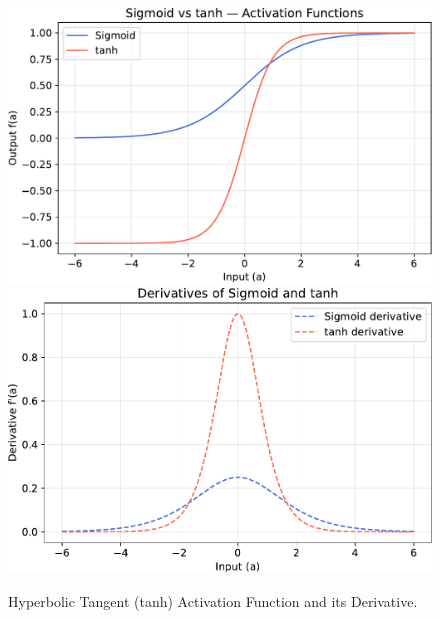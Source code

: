 \begin{figure}[!htp]
    \centering
    \includegraphics[width=\textwidth]{img/fnns/tanh-activation-functions.pdf}
    \includegraphics[width=\textwidth]{img/fnns/tanh-derivatives.pdf}
    \caption{Hyperbolic Tangent (tanh) Activation Function and its Derivative.}
    \label{fig:tanh-activation-function}
\end{figure}

